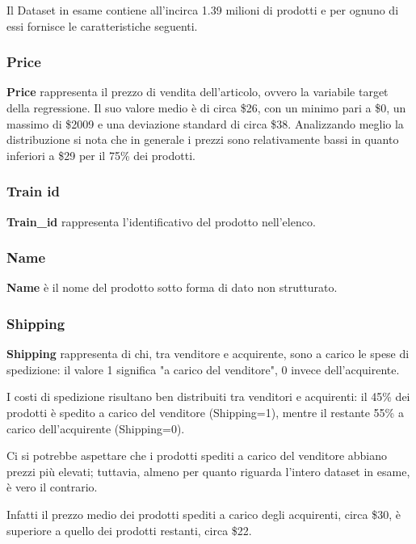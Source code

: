 
Il Dataset in esame contiene all'incirca 1.39 milioni di prodotti e per ognuno
di essi fornisce le caratteristiche seguenti.
\subsubsection{Price}
\textbf{Price} rappresenta il prezzo di vendita dell'articolo, ovvero la
variabile target della regressione. Il suo valore medio è di circa \$26, con un
minimo pari a \$0, un massimo di \$2009 e una deviazione standard di circa \$38.
Analizzando meglio la distribuzione si nota che in generale i prezzi sono
relativamente bassi in quanto inferiori a \$29 per il 75\% dei prodotti.
\subsubsection{Train id}
\textbf{Train\_id} rappresenta l'identificativo del prodotto nell'elenco.
\subsubsection{Name}
\textbf{Name} è il nome del prodotto sotto forma di dato non strutturato.
\subsubsection{Shipping}
\textbf{Shipping} rappresenta di chi, tra venditore e acquirente, sono a carico
le spese di spedizione: il valore 1 significa "a carico del
venditore", 0 invece dell'acquirente.

I costi di spedizione risultano ben distribuiti tra venditori e acquirenti: il
45\% dei prodotti è spedito a carico del venditore (Shipping=1), mentre il
restante 55\% a carico dell'acquirente (Shipping=0).

Ci si potrebbe aspettare che i prodotti spediti a carico del venditore abbiano
prezzi più elevati; tuttavia, almeno per quanto riguarda l'intero dataset in
esame, è vero il contrario.

Infatti il prezzo medio dei prodotti spediti a carico degli acquirenti, circa
\$30, è superiore a quello dei prodotti restanti, circa \$22.

